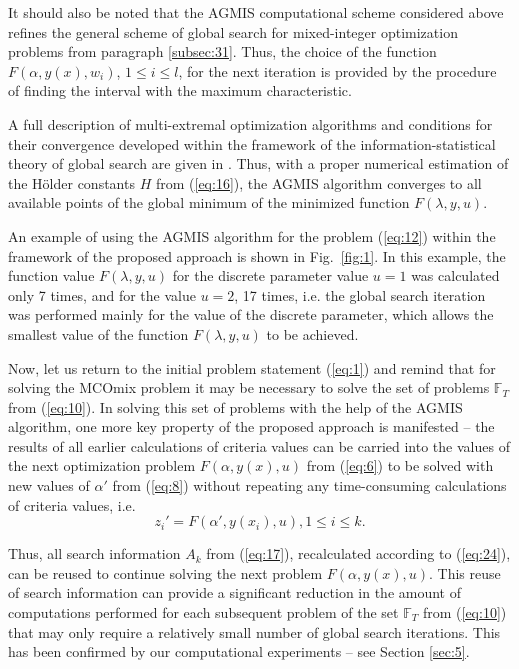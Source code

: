 \documentclass{svproc}
\begin{document}
It should also be noted that the AGMIS computational scheme considered above refines the general scheme of global search for mixed-integer optimization problems from paragraph \ref{subsec:31}. Thus, the choice of the function $F(\alpha, y(x), w_i)$, $1\leq i\leq l$, for the next iteration is provided by the procedure of finding the interval with the maximum characteristic.

A full description of multi-extremal optimization algorithms and conditions for their convergence developed within the framework of the information-statistical theory of global search are given in \cite{c24}. Thus, with a proper numerical estimation of the H{\"o}lder constants $H$ from (\ref{eq:16}), the AGMIS algorithm converges to all available points of the global minimum of the minimized function $F(\lambda, y, u)$.
 
An example of using the AGMIS algorithm for the problem (\ref{eq:12}) within the framework of the proposed approach is shown in Fig.~\ref{fig:1}. In this example, the function value $F(\lambda, y, u)$ for the discrete parameter value $u=1$ was calculated only 7 times, and for the value $u=2$, 17 times, i.e. the global search iteration was performed mainly for the value of the discrete parameter, which allows the smallest value of the function $F(\lambda, y, u)$ to be achieved.

Now, let us return to the initial problem statement (\ref{eq:1}) and remind that for solving the MCOmix problem it may be necessary to solve the set of problems $\mathbb{F}_T$ from (\ref{eq:10}). In solving this set of problems with the help of the AGMIS algorithm, one more key property of the proposed approach is manifested -- the results of all earlier  calculations of criteria values can be carried into the values of the next optimization problem $F(\alpha, y(x), u)$ from (\ref{eq:6}) to be solved with new values of $\alpha'$ from (\ref{eq:8}) without repeating any time-consuming calculations of criteria values, i.e.
\begin{equation}\label{eq:24}
 z_i'=F(\alpha',y(x_i), u), 1 \leq i \leq k.
\end{equation}

Thus, all search information $A_k$ from (\ref{eq:17}), recalculated according to (\ref{eq:24}), can be reused to continue solving the next problem $F(\alpha, y(x), u)$.  This reuse of search information can provide a significant reduction in the amount of computations performed for each subsequent problem of the set $\mathbb{F}_T$ from (\ref{eq:10})  that may only require a relatively small number of global search iterations. This  has been confirmed  by our computational experiments -- see Section \ref{sec:5}.
\end{document}
